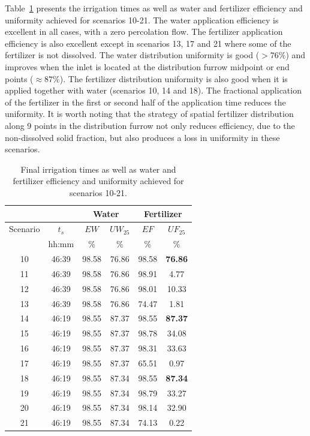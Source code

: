 \documentclass[review,authoryear]{elsarticle}
\begin{document}
Table~\ref{TabFurrowNetwork} presents the irrigation times as well as water and
fertilizer efficiency and uniformity achieved for scenarios 10-21.  The water application efficiency is excellent in all cases, with a
zero percolation flow. The fertilizer application efficiency is also excellent
except in scenarios 13, 17 and 21 where some of the fertilizer is not dissolved. 
The water distribution uniformity is good ($>76\%$) and improves when the inlet
is located at the distribution furrow midpoint or end points ($\approx 87\%$).
The fertilizer distribution uniformity is also good when it is applied together
with water (scenarios 10, 14 and 18). The fractional application of the fertilizer in
the first or second half of the application time reduces the uniformity. It is
worth noting that the strategy of spatial fertilizer distribution along 9 points
in the distribution furrow not only reduces efficiency, due to the non-dissolved
solid fraction, but also produces a loss in uniformity in these scenarios.

\begin{table}[ht!]
\centering
\caption{Final irrigation times as well as water and fertilizer
efficiency and uniformity achieved for scenarios 10-21.\label{TabFurrowNetwork}}
\footnotesize
\begin{tabular}{|c|c|cc|cc|}
\hline
&&\multicolumn{2}{|c|}{Water}&\multicolumn{2}{|c|}{Fertilizer}\\
\hline
Scenario&$t_s$&$EW$&$UW_{25}$&$EF$&$UF_{25}$\\
&hh:mm&\%&\%&\%&\%\\
\hline
10&46:39&98.58&76.86&98.58&\bf 76.86\\
11&46:39&98.58&76.86&98.91&4.77\\
12&46:39&98.58&76.86&98.01&10.33\\
13&46:39&98.58&76.86&74.47&1.81\\
14&46:19&98.55&87.37&98.55&\bf 87.37\\
15&46:19&98.55&87.37&98.78&34.08\\
16&46:19&98.55&87.37&98.31&33.63\\
17&46:19&98.55&87.37&65.51&0.97\\
18&46:19&98.55&87.34&98.55&\bf 87.34\\
19&46:19&98.55&87.34&98.79&33.27\\
20&46:19&98.55&87.34&98.14&32.90\\
21&46:19&98.55&87.34&74.13&0.22\\
\hline
\end{tabular}
\end{table}
\end{document}
